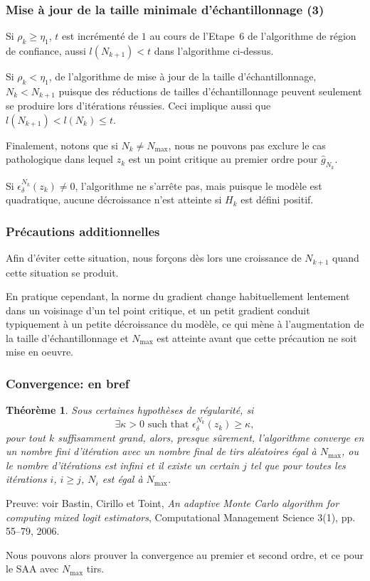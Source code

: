 \documentclass[french]{beamer}
\newtheorem{theo}{Théorème}
\begin{document}
\begin{frame}
\frametitle{Mise à jour de la taille minimale d'échantillonnage (3)}

Si $\rho_k \geq \eta_1$, $t$ est incrémenté de $1$ au cours de
l'Etape~6 de l'algorithme de région de confiance, aussi $l(N_{k+1}) <
t$ dans l'algorithme ci-dessus.

Si $\rho_k < \eta_1$, de l'algorithme de mise à jour de la taille
d'échantillonnage, $N_k < N_{k+1}$ puisque des réductions de tailles
d'échantillonnage peuvent seulement se produire lors d'itérations
réussies. Ceci implique aussi que $l(N_{k+1}) < l(N_k) \leq t$.

\mbox{}

Finalement, notons que si $N_k \ne N_{\max}$, nous ne pouvons pas
exclure le cas pathologique dans lequel $z_k$ est un point critique au
premier ordre pour $\hat{g}_{N_k}$.

Si $\epsilon_{\delta}^{N_k}(z_k) \ne 0$, l'algorithme ne s'arrête pas,
mais puisque le modèle est quadratique, aucune décroissance n'est
atteinte si $H_k$ est défini positif.

\end{frame}

\begin{frame}
\frametitle{Précautions additionnelles}

Afin d'éviter cette situation, nous forçons dès lors une croissance de
$N_{k+1}$ quand cette situation se produit.

\mbox{}

En pratique cependant, la norme du gradient change habituellement
lentement dans un voisinage d'un tel point critique, et un petit
gradient conduit typiquement à un petite décroissance du modèle, ce
qui mène à l'augmentation de la taille d'échantillonnage et $N_{\max}$
est atteinte avant que cette précaution ne soit mise en oeuvre. 

\end{frame}

\begin{frame}
\frametitle{Convergence: en bref}

\begin{theo}
Sous certaines hypothèses de régularité, si
\[
\exists \kappa > 0\text{ such that }
\epsilon_{\delta}^{N_k}(z_k) \geq \kappa,
\]
pour tout $k$ suffisamment grand, alors, presque sûrement,
l'algorithme converge en un nombre fini d'itération avec un nombre
final de tirs aléatoires égal à $N_{\max}$, ou le nombre d'itérations
est infini et il existe un certain $j$ tel que pour toutes les
itérations $i$, $i \geq j$, $N_i$ est égal à $N_{\max}$.
\end{theo}
Preuve: voir Bastin, Cirillo et Toint, {\sl An adaptive {Monte Carlo}
  algorithm for computing mixed logit estimators}, Computational
Management Science 3(1), pp. 55--79, 2006.

\mbox{}

Nous pouvons alors prouver la convergence au premier et second ordre,
et ce pour le SAA avec $N_{\max}$ tirs.

\end{frame}
\end{document}
